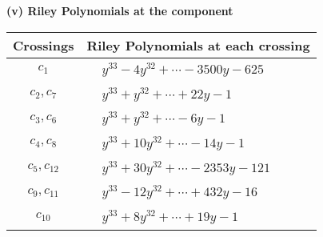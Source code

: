 \documentclass[1p]{elsarticle_modified}
\theoremstyle{definition}
\begin{document}
\newpage\renewcommand{\arraystretch}{1}
\flushleft \textbf{(v) Riley Polynomials at the component}\newline \\
\begin{tabular}{m{50pt}|m{274pt}}
Crossings & \hspace{64pt}Riley Polynomials at each crossing \\
\hline $$\begin{aligned}c_{1}\end{aligned}$$&$\begin{aligned}
&y^{33}-4 y^{32}+\cdots-3500 y-625
\end{aligned}$\\
\hline $$\begin{aligned}c_{2},c_{7}\end{aligned}$$&$\begin{aligned}
&y^{33}+y^{32}+\cdots+22 y-1
\end{aligned}$\\
\hline $$\begin{aligned}c_{3},c_{6}\end{aligned}$$&$\begin{aligned}
&y^{33}+y^{32}+\cdots-6 y-1
\end{aligned}$\\
\hline $$\begin{aligned}c_{4},c_{8}\end{aligned}$$&$\begin{aligned}
&y^{33}+10 y^{32}+\cdots-14 y-1
\end{aligned}$\\
\hline $$\begin{aligned}c_{5},c_{12}\end{aligned}$$&$\begin{aligned}
&y^{33}+30 y^{32}+\cdots-2353 y-121
\end{aligned}$\\
\hline $$\begin{aligned}c_{9},c_{11}\end{aligned}$$&$\begin{aligned}
&y^{33}-12 y^{32}+\cdots+432 y-16
\end{aligned}$\\
\hline $$\begin{aligned}c_{10}\end{aligned}$$&$\begin{aligned}
&y^{33}+8 y^{32}+\cdots+19 y-1
\end{aligned}$\\
\hline
\end{tabular}\\~\\
\end{document}
